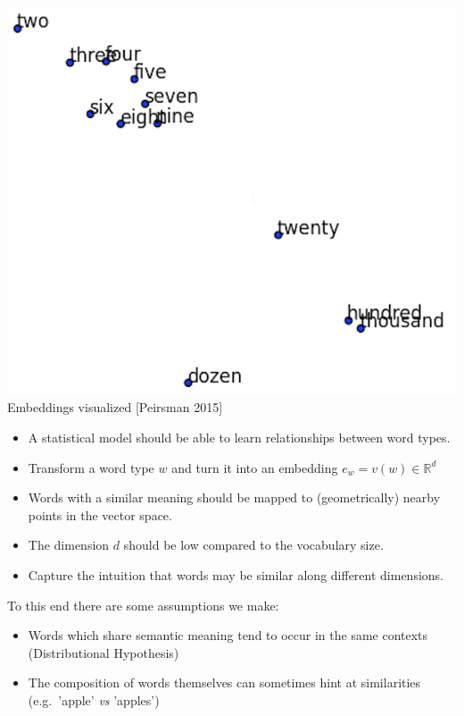 \documentclass[11pt, a4paper, landscape]{article}
\begin{document}
\begin{minipage}[b]{.4\linewidth}
  \includegraphics[width=\linewidth]{../article/img/word-embeddings-numbers}\\
  Embeddings visualized {[}Peirsman 2015{]}
\end{minipage}
\begin{minipage}[b]{.6\linewidth}
\begin{itemize}
\item A statistical model should be able to learn relationships between word types.
\item Transform a word type $w$ and turn it into an embedding $e_w = v(w) \in \mathbb{R}^d$
\item Words with a similar meaning should be mapped to (geometrically) nearby points in the vector space.
\item The dimension $d$ should be low compared to the vocabulary size.
\item Capture the intuition that words may be similar along different dimensions.
\end{itemize}
\end{minipage}

\NewPage{} 
\hypertarget{sli:goals}{}

\vfill
 To this end there are some assumptions we make:
\begin{itemize}
\item Words which share semantic meaning tend to occur in the same contexts (Distributional Hypothesis)
\item The composition of words themselves can sometimes hint at similarities (e.g.\ 'apple' \textit{vs} 'apples')
\end{itemize}
\vfill
\end{document}

